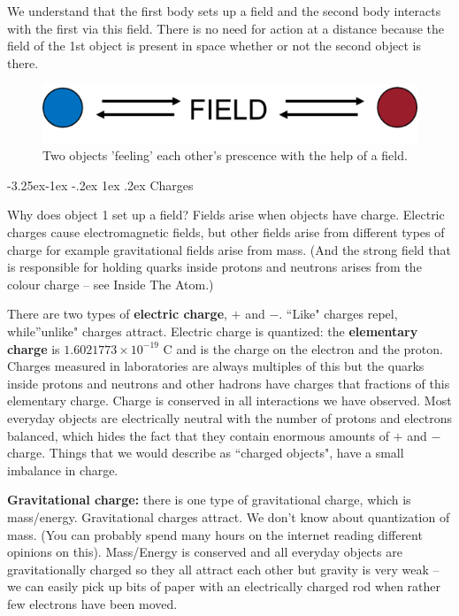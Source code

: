 \documentclass[
]{book}
\makeatletter
\renewcommand\subsection{%
\@startsection{subsection}{2}{\z@}%
              {-3.25ex\@plus -1ex \@minus -.2ex}%
              {1ex \@plus .2ex}%
              {\sffamily\bfseries}}
\makeatother
\begin{document}
We understand that the first body sets up a field and the second body
interacts with the first via this field. There is no need for action at
a distance because the field of the 1st object is present in space
whether or not the second object is there.

\begin{figure}

{\centering \includegraphics[width=0.7\linewidth]{Figures/blue_red_FIELD} 

}

\caption{Two objects 'feeling' each other's prescence with the help of a field.}\label{fig:blueredField}
\end{figure}

\hypertarget{charges}{%
\subsection{Charges}\label{charges}}

Why does object 1 set up a field? Fields arise when objects have charge.
Electric charges cause electromagnetic fields, but other fields arise
from different types of charge for example gravitational fields arise
from mass. (And the strong field that is responsible for holding quarks
inside protons and neutrons arises from the colour charge -- see Inside
The Atom.)

There are two types of \textbf{electric charge}, \(+\) and \(-\). ``Like" charges
repel, while''unlike" charges attract. Electric charge is quantized:
the \textbf{elementary charge} is \(1.6021773 \times 10^{-19}\) C and is the
charge on the electron and the proton. Charges measured in laboratories
are always multiples of this but the quarks inside protons and neutrons
and other hadrons have charges that fractions of this elementary charge.
Charge is conserved in all interactions we have observed. Most everyday
objects are electrically neutral with the number of protons and
electrons balanced, which hides the fact that they contain enormous
amounts of \(+\) and \(-\) charge. Things that we would describe as ``charged
objects", have a small imbalance in charge.

\textbf{Gravitational charge:} there is one type of gravitational charge,
which is mass/energy. Gravitational charges attract. We don't know about
quantization of mass. (You can probably spend many hours on the internet
reading different opinions on this). Mass/Energy is conserved and all
everyday objects are gravitationally charged so they all attract each
other but gravity is very weak -- we can easily pick up bits of paper
with an electrically charged rod when rather few electrons have been
moved.
\end{document}
